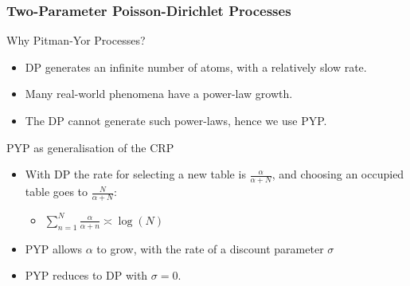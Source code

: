 \documentclass{beamer}
\begin{document}
\begin{frame}
    \frametitle{Two-Parameter Poisson-Dirichlet Processes}

    \begin{block}{Why Pitman-Yor Processes?}
        \begin{itemize}
            \item DP generates an infinite number of atoms, with a relatively slow rate.
            \item Many real-world phenomena have a power-law growth.
            \item The DP cannot generate such power-laws, hence we use PYP.
        \end{itemize}
    \end{block}

    \begin{block}{PYP as generalisation of the CRP}
        \begin{itemize}
            \item With DP the rate for selecting a new table is $\frac{\alpha}{\alpha+N}$, and choosing an occupied table goes to $\frac{N}{\alpha+N}$:
            \begin{itemize}
                \item $\sum_{n=1}^N\frac{\alpha}{\alpha+n}\asymp\log(N)$
            \end{itemize}
            \item PYP allows $\alpha$ to grow, with the rate of a discount parameter $\sigma$
            \item PYP reduces to DP with $\sigma=0$.
        \end{itemize}
    \end{block}
    
\end{frame}
\end{document}
